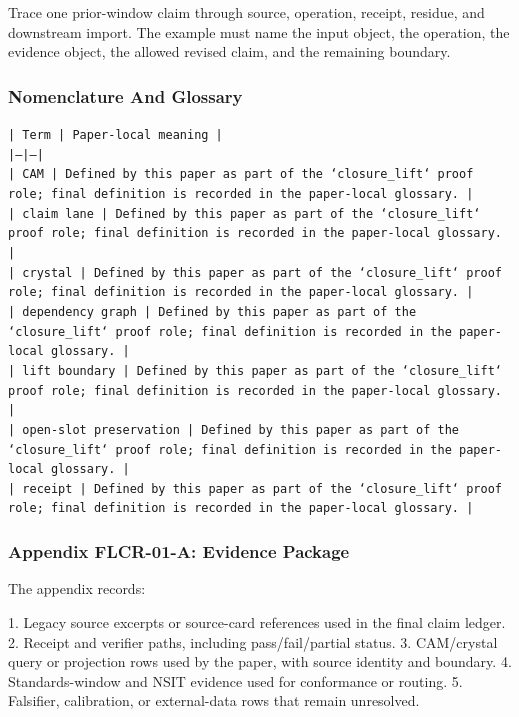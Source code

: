 \documentclass[11pt]{article}
\begin{document}
Trace one prior-window claim through source, operation, receipt, residue, and downstream import. The example must name the input object, the operation,
the evidence object, the allowed revised claim, and the remaining boundary.

\subsubsection*{Nomenclature And Glossary}

\noindent\texttt{| Term | Paper-local meaning |}\\
\noindent\texttt{|---|---|}\\
\noindent\texttt{| CAM | Defined by this paper as part of the `closure\_lift` proof role; final definition is recorded in the paper-local glossary. |}\\
\noindent\texttt{| claim lane | Defined by this paper as part of the `closure\_lift` proof role; final definition is recorded in the paper-local glossary. |}\\
\noindent\texttt{| crystal | Defined by this paper as part of the `closure\_lift` proof role; final definition is recorded in the paper-local glossary. |}\\
\noindent\texttt{| dependency graph | Defined by this paper as part of the `closure\_lift` proof role; final definition is recorded in the paper-local glossary. |}\\
\noindent\texttt{| lift boundary | Defined by this paper as part of the `closure\_lift` proof role; final definition is recorded in the paper-local glossary. |}\\
\noindent\texttt{| open-slot preservation | Defined by this paper as part of the `closure\_lift` proof role; final definition is recorded in the paper-local glossary. |}\\
\noindent\texttt{| receipt | Defined by this paper as part of the `closure\_lift` proof role; final definition is recorded in the paper-local glossary. |}\\

\subsubsection*{Appendix FLCR-01-A: Evidence Package}

The appendix records:

1. Legacy source excerpts or source-card references used in the final claim ledger.
2. Receipt and verifier paths, including pass/fail/partial status.
3. CAM/crystal query or projection rows used by the paper, with source identity and boundary.
4. Standards-window and NSIT evidence used for conformance or routing.
5. Falsifier, calibration, or external-data rows that remain unresolved.
\end{document}
